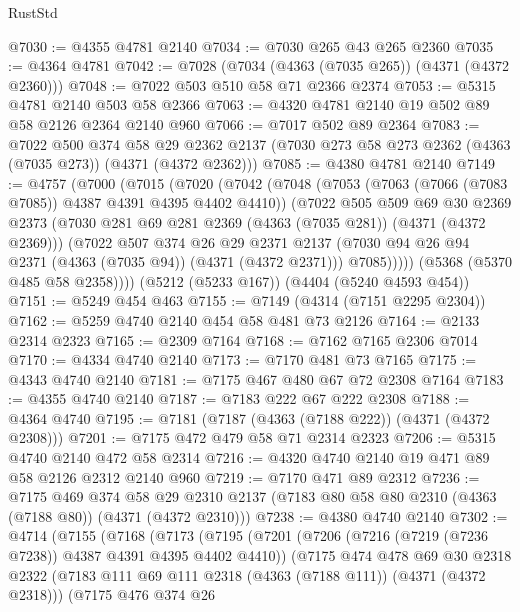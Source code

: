 \begin{lexlean}{RustStd}
\begin{coremodule}
@7030 := @4355 @4781 @2140
@7034 := @7030 @265 @43 @265 @2360
@7035 := @4364 @4781
@7042 := @7028 (@7034 (@4363 (@7035 @265)) (@4371 (@4372 @2360)))
@7048 := @7022 @503 @510 @58 @71 @2366 @2374
@7053 := @5315 @4781 @2140 @503 @58 @2366
@7063 := @4320 @4781 @2140 @19 @502 @89 @58 @2126 @2364 @2140 @960
@7066 := @7017 @502 @89 @2364
@7083 := @7022
    @500
    @374
    @58
    @29
    @2362
    @2137
    (@7030 @273 @58 @273 @2362 (@4363 (@7035 @273)) (@4371 (@4372 @2362)))
@7085 := @4380 @4781 @2140
@7149 := @4757
    (@7000
      (@7015
        (@7020
          (@7042
            (@7048
              (@7053 (@7063 (@7066 (@7083 @7085)) @4387 @4391 @4395 @4402 @4410))
              (@7022
                @505
                @509
                @69
                @30
                @2369
                @2373
                (@7030 @281 @69 @281 @2369 (@4363 (@7035 @281)) (@4371 (@4372 @2369)))
                (@7022
                  @507
                  @374
                  @26
                  @29
                  @2371
                  @2137
                  (@7030 @94 @26 @94 @2371 (@4363 (@7035 @94)) (@4371 (@4372 @2371)))
                  @7085)))))
        (@5368 (@5370 @485 @58 @2358))))
    (@5212 (@5233 @167))
    (@4404 (@5240 @4593 @454))
@7151 := @5249 @454 @463
@7155 := @7149 (@4314 (@7151 @2295 @2304))
@7162 := @5259 @4740 @2140 @454 @58 @481 @73 @2126
@7164 := @2133 @2314 @2323
@7165 := @2309 @7164
@7168 := @7162 @7165 @2306 @7014
@7170 := @4334 @4740 @2140
@7173 := @7170 @481 @73 @7165
@7175 := @4343 @4740 @2140
@7181 := @7175 @467 @480 @67 @72 @2308 @7164
@7183 := @4355 @4740 @2140
@7187 := @7183 @222 @67 @222 @2308
@7188 := @4364 @4740
@7195 := @7181 (@7187 (@4363 (@7188 @222)) (@4371 (@4372 @2308)))
@7201 := @7175 @472 @479 @58 @71 @2314 @2323
@7206 := @5315 @4740 @2140 @472 @58 @2314
@7216 := @4320 @4740 @2140 @19 @471 @89 @58 @2126 @2312 @2140 @960
@7219 := @7170 @471 @89 @2312
@7236 := @7175
    @469
    @374
    @58
    @29
    @2310
    @2137
    (@7183 @80 @58 @80 @2310 (@4363 (@7188 @80)) (@4371 (@4372 @2310)))
@7238 := @4380 @4740 @2140
@7302 := @4714
    (@7155
      (@7168
        (@7173
          (@7195
            (@7201
              (@7206 (@7216 (@7219 (@7236 @7238)) @4387 @4391 @4395 @4402 @4410))
              (@7175
                @474
                @478
                @69
                @30
                @2318
                @2322
                (@7183 @111 @69 @111 @2318 (@4363 (@7188 @111)) (@4371 (@4372 @2318)))
                (@7175
                  @476
                  @374
                  @26

\end{coremodule}
\end{lexlean}
